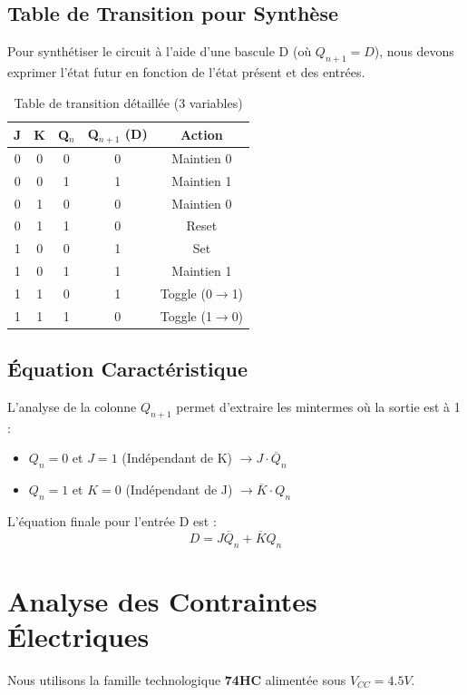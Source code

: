 \documentclass[12pt, a4paper]{article}
\newcommand{\motcle}[1]{\textcolor{HighlightRed}{\textbf{#1}}}
\begin{document}
\subsection{Table de Transition pour Synthèse}
Pour synthétiser le circuit à l'aide d'une bascule D (où $Q_{n+1} = D$), nous devons exprimer l'état futur en fonction de l'état présent et des entrées.

\begin{table}[H]
\centering
\caption{Table de transition détaillée (3 variables)}
\vspace{0.2cm}
\begin{tabular}{|c|c|c||c|c|}
\hline
\rowcolor{EnsaTeal!20} \textbf{J} & \textbf{K} & \textbf{Q$_n$} & \textbf{Q$_{n+1}$ (D)} & \textbf{Action} \\ \hline
0 & 0 & 0 & 0 & Maintien 0 \\ \hline
0 & 0 & 1 & 1 & Maintien 1 \\ \hline
0 & 1 & 0 & 0 & Maintien 0 \\ \hline
0 & 1 & 1 & 0 & Reset \\ \hline
1 & 0 & 0 & 1 & Set \\ \hline
1 & 0 & 1 & 1 & Maintien 1 \\ \hline
1 & 1 & 0 & 1 & Toggle (0$\to$1) \\ \hline
1 & 1 & 1 & 0 & Toggle (1$\to$0) \\ \hline
\end{tabular}
\end{table}

\subsection{Équation Caractéristique}
L'analyse de la colonne $Q_{n+1}$ permet d'extraire les mintermes où la sortie est à 1 :
\begin{itemize}
    \item $Q_n=0$ et $J=1$ (Indépendant de K) $\rightarrow J \cdot \overline{Q}_n$
    \item $Q_n=1$ et $K=0$ (Indépendant de J) $\rightarrow \overline{K} \cdot Q_n$
\end{itemize}

L'équation finale pour l'entrée D est :
\begin{equation}
    \boxed{D = J\overline{Q}_n + \overline{K}Q_n}
\end{equation}

\section{Analyse des Contraintes Électriques}
Nous utilisons la famille technologique \motcle{74HC} alimentée sous $V_{CC} = 4.5V$.
\end{document}
